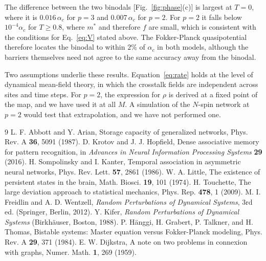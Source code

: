 \documentclass[aps,pre,twocolumn,superscriptaddress,floatfix]{revtex4-2}
\begin{document}
The difference between the two binodals [Fig.~\ref{fig:phase}(c)] is largest at $T=0$, where it is $0.016\,\alpha_c$ for $p=3$ and $0.007\,\alpha_c$ for $p=2$. For $p=2$ it falls below $10^{-4}\alpha_c$ for $T\ge0.8$, where $m^*$ and therefore $f$ are small, which is consistent with the conditions for Eq.~\eqref{eq:V} stated above. The Fokker-Planck quasipotential therefore locates the binodal to within $2\%$ of $\alpha_c$ in both models, although the barriers themselves need not agree to the same accuracy away from the binodal.

Two assumptions underlie these results. Equation~\eqref{eq:rate} holds at the level of dynamical mean-field theory, in which the crosstalk fields are independent across sites and time steps. For $p=2$, the expression for $\rho$ is derived at a fixed point of the map, and we have used it at all $M$. A simulation of the $N$-spin network at $p=2$ would test that extrapolation, and we have not performed one.

\begin{thebibliography}{9}
 L. F. Abbott and Y. Arian, Storage capacity of generalized networks, Phys. Rev. A \textbf{36}, 5091 (1987).
 D. Krotov and J. J. Hopfield, Dense associative memory for pattern recognition, in \textit{Advances in Neural Information Processing Systems} \textbf{29} (2016).
 H. Sompolinsky and I. Kanter, Temporal association in asymmetric neural networks, Phys. Rev. Lett. \textbf{57}, 2861 (1986).
 W. A. Little, The existence of persistent states in the brain, Math. Biosci. \textbf{19}, 101 (1974).
 H. Touchette, The large deviation approach to statistical mechanics, Phys. Rep. \textbf{478}, 1 (2009).
 M. I. Freidlin and A. D. Wentzell, \textit{Random Perturbations of Dynamical Systems}, 3rd ed. (Springer, Berlin, 2012).
 Y. Kifer, \textit{Random Perturbations of Dynamical Systems} (Birkh\"auser, Boston, 1988).
 P. H\"anggi, H. Grabert, P. Talkner, and H. Thomas, Bistable systems: Master equation versus Fokker-Planck modeling, Phys. Rev. A \textbf{29}, 371 (1984).
 E. W. Dijkstra, A note on two problems in connexion with graphs, Numer. Math. \textbf{1}, 269 (1959).
\end{thebibliography}
\end{document}
